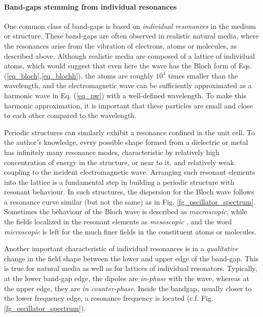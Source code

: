 \paragraph{Band-gaps stemming from individual resonances}%
One common class of band-gaps is based on \textit{individual resonances} in the medium or structure. These band-gaps are often observed in realistic natural media, where the resonances arise from the vibration of electrons, atoms or molecules, as described above. 
Although realistic media are composed of a lattice of individual atoms, which would suggest that even here the wave has the Bloch form of Eqs. (\ref{eq_bloch},\ref{eq_blochh}), the atoms are roughly $10^{4}$ times smaller than the wavelength, and the electromagnetic wave can be sufficiently approximated as a harmonic wave in Eq. (\ref{eq_pw}) with a well-defined wavelength.  To make this harmonic approximation, it is important that these particles are small and close to each other compared to the wavelength. %

Periodic structures can similarly exhibit a resonance confined in the unit cell. 
To the author's knowledge,  %
every possible shape formed from a dielectric or metal has infinitely many resonance modes,  %
characteristic by relatively high concentration of energy in the structure, or near to it, and relatively weak coupling to the incident electromagnetic wave.  %
Arranging such resonant elements into the lattice is a fundamental step in building a periodic structure with resonant behaviour. In such structures, the dispersion for the Bloch wave follows a resonance curve similar (but not the same) as in Fig. \ref{fg_oscillator_spectrum}. Sometimes the behaviour of the Bloch wave is described as \textit{macroscopic}, while the fields localized in the resonant elements as \textit{mesoscopic} \cite{felbacq2005theory}, and the word \textit{microscopic} is left for the much finer fields in the constituent atoms or molecules.

Another important characteristic of individual resonances is in a \textit{qualitative} change in the field shape between the lower and upper edge of the band-gap. This is true for natural media as well as for lattices of individual resonators. Typically, at the lower band-gap edge, the dipoles are \textit{in-phase} with the wave, whereas at the upper edge, they are \textit{in counter-phase}.  %
Inside the bandgap, usually closer to the lower frequency edge, a resonance frequency is located (c.f. Fig. \ref{fg_oscillator_spectrum}).

